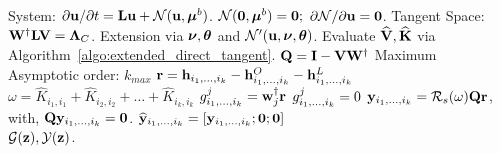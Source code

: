   \begin{algorithm}
 	\caption{Center--Manifold: Graph parameterization}\label{algo:graph_form}
 	\begin{algorithmic}[0]
 		\Require System: $\partial \mathbf{u}/\partial t = \mathbf{L} \mathbf{u} + \mathcal{N}(\mathbf{u},\boldsymbol{\mu}^{b})$.
 		\Ensure $\mathcal{N}(\mathbf{0},\boldsymbol{\mu}^{b}) = \mathbf{0};$ $\partial\mathcal{N}/\partial \mathbf{u} = \mathbf{0}$. 
 		\Require Tangent Space: $\mathbf{W}^{\dagger}\mathbf{L} \mathbf{V} = \mathbf{\Lambda}_{C}$.
 		\Require Extension via $\boldsymbol{\nu}, \boldsymbol{\theta}$ and $\mathcal{N}'(\mathbf{u},\boldsymbol{\nu},\boldsymbol{\theta})$.
 		\State Evaluate $\widehat{\mathbf{V}},\mathbf{\widehat{K}}$ via Algorithm~\ref{algo:extended_direct_tangent}. 
 		\State $\mathbf{Q} = \mathbf{I} - \mathbf{V}\mathbf{W}^{\dagger}$ 
 		\Require Maximum Asymptotic order: $k_{max}$
 		\State {}
 		\State $\mathbf{r} = \mathbf{h}_{i_{1},\ldots,i_{k}} - \mathbf{h}^{O}_{i_{1},\ldots,i_{k}} - \mathbf{h}^{L}_{i_{1},\ldots,i_{k}}$ %
 		\State $\omega = \widehat{K}_{i_{1},i_{1}} + \widehat{K}_{i_{2},i_{2}} + \ldots + \widehat{K}_{i_{k},i_{k}}$
 		\State {}
 		\State $g^{j}_{i_{1},\ldots,i_{k}} = \mathbf{w}^{\dagger}_{j}\mathbf{r}$
 		\EndFor
 		\State $g^{j}_{i_{1},\ldots,i_{k}} = 0$
 		\EndFor
 		\State {}
 		\State $\mathbf{y}_{i_{1},\ldots,i_{k}} = \mathcal{R}_{s}(\omega)\mathbf{Q}\mathbf{r}$, 
 		\State with, $\mathbf{Q}\mathbf{y}_{i_{1},\ldots,i_{k}} = \mathbf{0}$. 
 		\State $\widehat{\mathbf{y}}_{i_{1},\ldots,i_{k}} = [\mathbf{y}_{i_{1},\ldots,i_{k}}; \mathbf{0}; \mathbf{0}]$
 		\EndFor
 		\EndFor \\
 		\Return $\mathcal{G}(\mathbf{z}),\mathcal{Y}(\mathbf{z})$.
 	\end{algorithmic}
 \end{algorithm}
 
